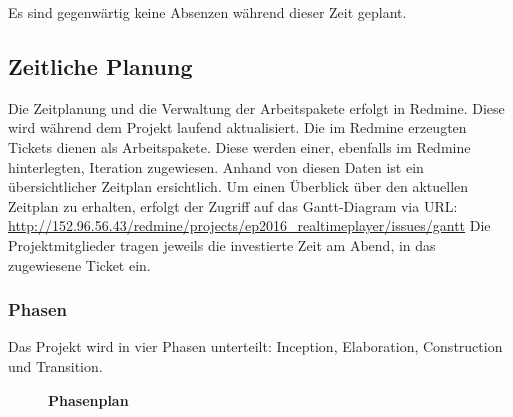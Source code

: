 \documentclass[a4,12pt]{scrartcl}
\begin{document}
\noindent Es sind gegenwärtig keine Absenzen während dieser Zeit geplant. 
\subsection{Zeitliche Planung}
Die Zeitplanung und die Verwaltung der Arbeitspakete erfolgt in Redmine. Diese wird während dem Projekt laufend aktualisiert. Die im Redmine erzeugten Tickets dienen als Arbeitspakete. Diese werden einer, ebenfalls im Redmine hinterlegten, Iteration zugewiesen. Anhand von diesen Daten ist ein übersichtlicher Zeitplan ersichtlich. Um einen Überblick über den aktuellen Zeitplan zu erhalten, erfolgt der Zugriff auf das Gantt-Diagram via URL:
\url{http://152.96.56.43/redmine/projects/ep2016_realtimeplayer/issues/gantt}
Die Projektmitglieder tragen jeweils die investierte Zeit am Abend, in das zugewiesene Ticket ein. 

\subsubsection{Phasen}
Das Projekt wird in vier Phasen unterteilt: Inception, Elaboration, Construction und Transition. 

\begin{center}
\begin{figure}[H]
\caption{\textbf{Phasenplan}}
\end{figure}
\end{center}
\newpage
\end{document}
